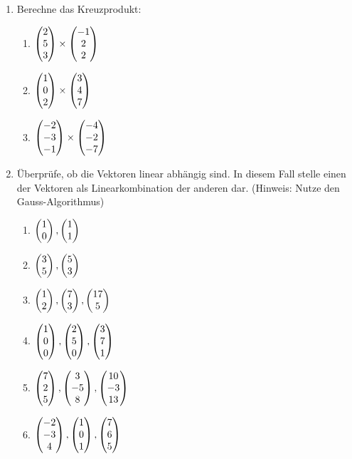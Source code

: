 \begin{enumerate}
			\item Berechne das Kreuzprodukt:
				\begin{multicols}{3}
			    	\begin{enumerate}
			        	\item $\mvect{2\\5\\3}\times\mvect{-1\\2\\2}$
			        	\item $\mvect{1\\0\\2}\times\mvect{3\\4\\7}$
			        	\item $\mvect{-2\\-3\\-1}\times\mvect{-4\\-2\\-7} $
			      	\end{enumerate}
			    \end{multicols}
			\item Überprüfe, ob die Vektoren linear abhängig sind. In diesem Fall stelle
			einen der Vektoren als Linearkombination der anderen dar. (Hinweis: Nutze den Gauss-Algorithmus)
			\begin{multicols}{2}
				\begin{enumerate}
					\item $\vect1,0 , \vect1,1$
				    \item $\vect3,5 , \vect5,3$
				    \item $\vect1,2 , \vect7,3 , \vect17,5$
				    \item $\mvect{1\\0\\0}, \mvect{2\\5\\0}, \mvect{3\\7\\1}$
				    \item $\mvect{7\\2\\5}, \mvect{3\\-5\\8}, \mvect{10\\-3\\13}$
				    \item $\mvect{-2\\-3\\4}, \mvect{1\\0\\1}, \mvect{7\\6\\5}$

\end{enumerate}
\end{multicols}
\end{enumerate}
